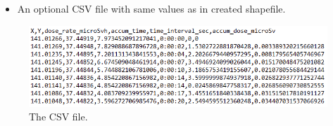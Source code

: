 \begin{itemize}
\item
  An optional CSV file with same values as in created shapefile.
\end{itemize}

\begin{figure}[H]
\centering
\includegraphics[scale = 0.8]{pictures/user_guide/csv.png}
\caption{The CSV file.}
\end{figure}



